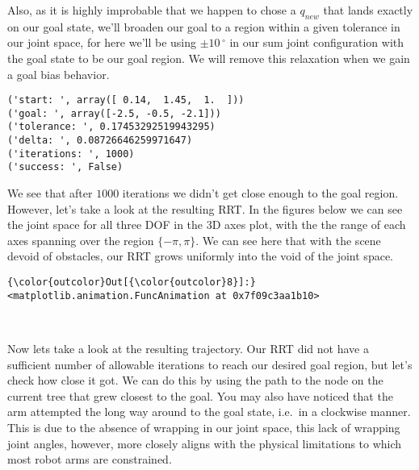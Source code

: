 \documentclass{article}
\begin{document}
Also, as it is highly improbable that we happen to chose a $q_{new}$
that lands exactly on our goal state, we'll broaden our goal to a region
within a given tolerance in our joint space, for here we'll be using
$\pm 10\,^{\circ}$ in our sum joint configuration with the goal state to
be our goal region. We will remove this relaxation when we gain a goal
bias behavior.


    \begin{Verbatim}[commandchars=\\\{\}]
('start: ', array([ 0.14,  1.45,  1.  ]))
('goal: ', array([-2.5, -0.5, -2.1]))
('tolerance: ', 0.17453292519943295)
('delta: ', 0.08726646259971647)
('iterations: ', 1000)
('success: ', False)
    \end{Verbatim}

    We see that after $1000$ iterations we didn't get close enough to the
goal region. However, let's take a look at the resulting RRT. In the
figures below we can see the joint space for all three DOF in the 3D
axes plot, with the the range of each axes spanning over the region
$\{-\pi,\pi\}$. We can see here that with the scene devoid of obstacles,
our RRT grows uniformly into the void of the joint space.



            \begin{Verbatim}[commandchars=\\\{\}]
{\color{outcolor}Out[{\color{outcolor}8}]:} <matplotlib.animation.FuncAnimation at 0x7f09c3aa1b10>
\end{Verbatim}
        
    \begin{center}
    \end{center}
    { \hspace*{\fill} \\}
    
    Now lets take a look at the resulting trajectory. Our RRT did not have a
sufficient number of allowable iterations to reach our desired goal
region, but let's check how close it got. We can do this by using the
path to the node on the current tree that grew closest to the goal. You
may also have noticed that the arm attempted the long way around to the
goal state, i.e.~in a clockwise manner. This is due to the absence of
wrapping in our joint space, this lack of wrapping joint angles,
however, more closely aligns with the physical limitations to which most
robot arms are constrained.
\end{document}

